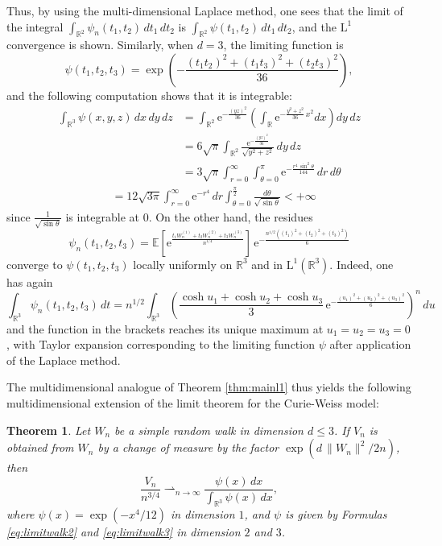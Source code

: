 \documentclass[12pt,a4paper,reqno]{amsart}
\newcommand{\R}{\mathbb{R}}
\newcommand{\E}{\mathrm{e}}
\newcommand{\esper}{\mathbb{E}}
\newtheorem{theorem}{Theorem}
\theoremstyle{remark}
\begin{document}
Thus, by using the multi-dimensional Laplace method, one sees that the limit of the integral $\int_{\R^2} \psi_n(t_1,t_2)\,dt_1\,dt_2$ is $\int_{\R^2} \psi(t_1,t_2)\,dt_1\,dt_2$, and the $\mathrm{L}^1$ convergence is shown. Similarly, when $d=3$, the limiting function is
 \begin{equation}
\psi(t_1,t_2,t_3)=\exp\left(-\frac{(t_1t_2)^2+(t_1t_3)^2+(t_2t_3)^2}{36}\right),\label{eq:limitwalk3} 
 \end{equation}
 and the following computation shows that it is integrable:
 \begin{align*}
 \int_{\R^3}\psi(x,y,z)\,dx\,dy \,dz&= \int_{\R^2}\E^{-\frac{(yz)^2}{36}}\left(\int_{\R}\E^{-\frac{y^2+z^2}{36}\,x^2}dx\right)dy\,dz\\
 &=6\sqrt{\pi}\int_{\R^2}\frac{\E^{-\frac{(yz)^2}{36}}}{\sqrt{y^2+z^2}}\,dy\,dz \\
 &=3\sqrt{\pi}\int_{r=0}^\infty \int_{\theta=0}^{\pi} \E^{-\frac{r^4\,\sin^2 \theta}{144}}\,dr\,d\theta \end{align*}
\begin{align*}
 &=12\sqrt{3\pi}\int_{r=0}^\infty \E^{-r^4}\,dr \int_{\theta=0}^{\frac{\pi}{2}} \frac{d\theta}{\sqrt{\sin \theta}}< + \infty
 \end{align*}
since $\frac{1}{\sqrt{\sin \theta}}$ is integrable at $0$. On the other hand, the residues
$$\psi_n(t_1,t_2,t_3)=\esper\left[\E^{\frac{t_1W_n^{(1)} + t_2W_n^{(2)}+t_3W_n^{(3)}}{n^{1/4}}}\right]\,\E^{-\frac{n^{1/2}((t_1)^2+(t_2)^2+(t_3)^2)}{6}}$$
converge to $\psi(t_1,t_2,t_3)$ locally uniformly on $\R^3$ and in $\mathrm{L}^1(\R^3)$. Indeed, one has again
$$\int_{\R^3} \psi_n(t_1,t_2,t_3)\,dt = n^{1/2}\int_{\R^3} \left(\frac{\cosh u_1 + \cosh u_2 + \cosh u_3}{3}\,\E^{-\frac{(u_1)^2+(u_2)^2+(u_3)^2}{6}}\right)^n\,du$$
and the function in the brackets reaches its unique maximum at $u_1=u_2=u_3=0$, with Taylor expansion corresponding to the limiting function $\psi$ after application of the Laplace method.\bigskip

The multidimensional analogue of Theorem \ref{thm:mainl1} thus yields the following multidimensional extension of the limit theorem for the Curie-Weiss model:

\begin{theorem}
Let $W_n$ be a simple random walk in dimension $d \leq 3$. If $V_n$ is obtained from $W_n$ by a change of measure by the factor $\exp(d\,\|W_n\|^2/2n)$, then 
$$\frac{V_n}{n^{3/4}} \rightharpoonup_{n \to \infty} \frac{\psi(x)\,dx}{\int_{\R^3}\psi(x)\,dx},$$
where $\psi(x)=\exp(-x^4/12)$ in dimension $1$, and $\psi$ is given by Formulas \eqref{eq:limitwalk2} and \eqref{eq:limitwalk3} in dimension $2$ and $3$.
\end{theorem}
\medskip
\end{document}
